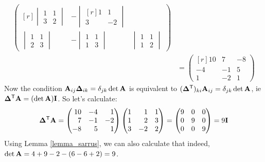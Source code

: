\documentclass[fleqn,a4paper,11pt]{article}
\begin{document}
\begin{enumerate}[label=\textbf{\arabic*.}]
\begin{align*}
\begin{pmatrix*}[r]
     \begin{vmatrix}
      1 & 1 \\
      3 & 2
     \end{vmatrix} &
     -\begin{vmatrix*}[r]
      1 & 1 \\
      3 & -2
     \end{vmatrix*} \\[3ex]
     \begin{vmatrix}
      1 & 1 \\
      2 & 3
     \end{vmatrix} &
     -\begin{vmatrix}
      1 & 1 \\
      1 & 3
     \end{vmatrix} &
     \begin{vmatrix}
      1 & 1 \\
      1 & 2
     \end{vmatrix}
    \end{pmatrix*} \\
    &= \begin{pmatrix*}[r]
     10 & 7 & -8 \\
     -4 & -1 & 5 \\
     1 & -2 & 1
    \end{pmatrix*}
   \end{align*}
   Now the condition \(\mathbf{A}_{ij}\mathbf{\Delta}_{ik} = \delta_{jk} \det \mathbf{A}\) is
   equivalent to \((\mathbf{\Delta}^{\mathsf T})_{ki} \mathbf{A}_{ij} = \delta_{jk} \det \mathbf{A}\),
   ie \(\mathbf{\Delta}^{\mathsf T}\mathbf{A} = (\det \mathbf{A})\mathbf{I}\). So let's calculate:
   \begin{equation*}
    \tran{\mat \Delta}\mat A =
    \begin{pmatrix*}[r]
     10 & -4 & 1 \\
     7 & -1 & -2 \\
     -8 & 5 & 1
    \end{pmatrix*}
    \begin{pmatrix*}[r]
     1 & 1 & 1 \\
     1 & 2 & 3 \\
     3 & -2 & 2
    \end{pmatrix*}
    = \begin{pmatrix}
     9 & 0 & 0 \\
     0 & 9 & 0 \\
     0 & 0 & 9
    \end{pmatrix}
    = 9\mat I
   \end{equation*}
   Using Lemma \ref{lemma_sarrus}, we can also calculate that indeed,
   \(\det \mathbf{A} = 4 + 9 - 2 - (6 - 6 + 2) = 9\).


\end{enumerate}
\end{document}
